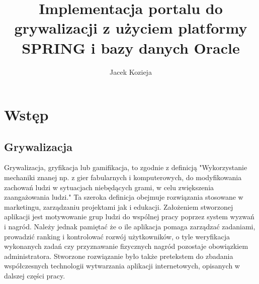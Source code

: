 \documentclass[a4paper,12pt,twoside,openany]{report}
\title{Implementacja portalu do grywalizacji z użyciem platformy SPRING i bazy danych Oracle}
\author{Jacek Kozieja}
\begin{document}
\maketitle
\chapter{Wstęp}
\section{Grywalizacja}
	Grywalizacja, gryfikacja lub gamifikacja, to zgodnie z definicją \cite{Wikipedia} "Wykorzystanie mechaniki znanej np. z gier fabularnych i komputerowych, do modyfikowania zachowań ludzi w sytuacjach niebędących grami, w celu zwiększenia zaangażowania ludzi." Ta szeroka definicja obejmuje rozwiązania stosowane w marketingu, zarządzaniu projektami jak i edukacji. Założeniem stworzonej aplikacji jest motywowanie grup ludzi do wspólnej pracy poprzez system wyzwań i nagród. Należy jednak pamiętać że o ile aplikacja pomaga zarządzać zadaniami, prowadzić ranking i kontrolować rozwój użytkowników, o tyle weryfikacja wykonanych zadań czy przyznawanie fizycznych nagród pozostaje obowiązkiem administratora. Stworzone rozwiązanie było także pretekstem do zbadania współczesnych technologii wytwarzania aplikacji internetowych, opisanych w dalszej części pracy. 
\end{document}
